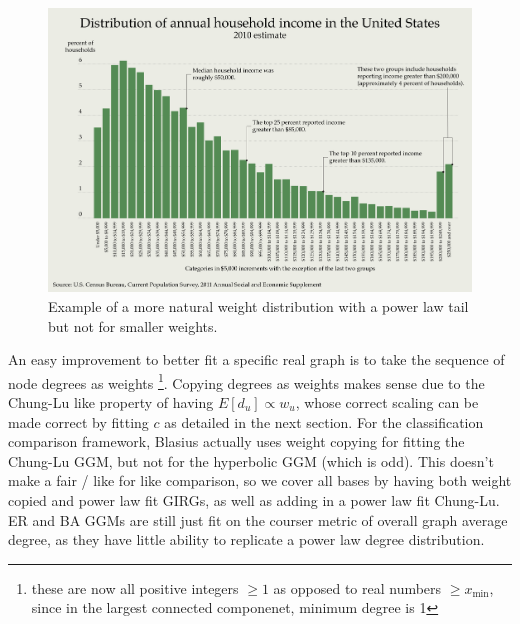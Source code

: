 \begin{figure}
    \centering
    \includegraphics[width=\textwidth]{./figures/Distribution_of_Annual_Household_Income_in_the_United_States_2010.png}
    \caption{Example of a more natural weight distribution with a power law tail but not for smaller weights.}
    \label{fig:natural_weight_distribution}
\end{figure}


An easy improvement to better fit a specific real graph is to take the sequence of node degrees as weights
\footnote{these are now all positive integers $\geq 1$ as opposed to real numbers $\geq x_{\min}$, since in the largest connected componenet, minimum degree is 1}. Copying degrees as weights makes sense due to the Chung-Lu like property of having $E[d_u] \propto w_u$, whose correct scaling can be made correct by fitting $c$ as detailed in the next section. 
For the classification comparison framework, Blasius actually uses weight copying for fitting the Chung-Lu GGM, but not for the hyperbolic GGM (which is odd). This doesn't make a fair / like for like comparison, so we cover all bases by having both weight copied and power law fit GIRGs, as well as adding in a power law fit Chung-Lu. ER and BA GGMs are still just fit on the courser metric of overall graph average degree, as they have little ability to replicate a power law degree distribution.

